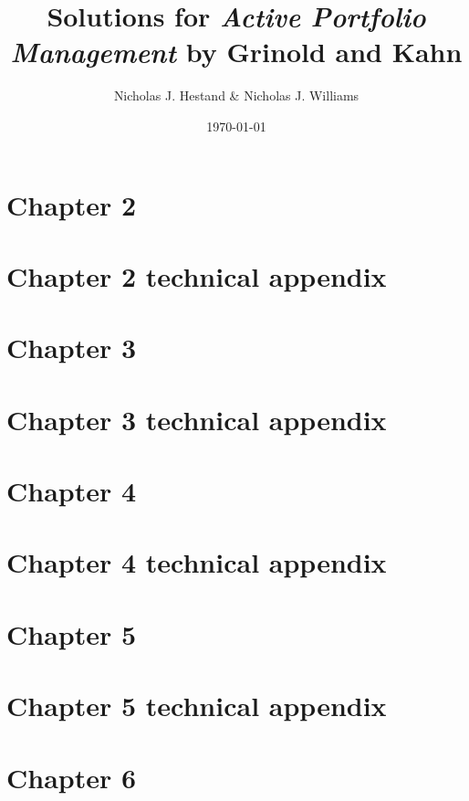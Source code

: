 \documentclass[10pt]{article}
\title{Solutions for \emph{Active Portfolio Management} by Grinold and Kahn}
\author{Nicholas J. Hestand \& Nicholas J. Williams}
\date{\today}
\begin{document}
  
  \maketitle
  
  \section*{Chapter 2}
  
  
  \newpage
  \section*{Chapter 2 technical appendix}
  
  
  \newpage
  \section*{Chapter 3}
  
  
  \newpage
  \section*{Chapter 3 technical appendix}
  
  
  \newpage
  \section*{Chapter 4}
   
  
  \newpage
  \section*{Chapter 4 technical appendix}
    
  
  \newpage
  \section*{Chapter 5}
  
    
  \newpage
  \section*{Chapter 5 technical appendix}
  
  
  \newpage
  \section*{Chapter 6}
  
  
\end{document}
